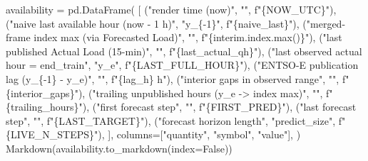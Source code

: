 \documentclass[
  english,
  letterpaper,
]{scrbook}
\newenvironment{Shaded}{\begin{snugshade}}{\end{snugshade}}
\newcommand{\BuiltInTok}[1]{\textcolor[rgb]{0.00,0.23,0.31}{#1}}
\newcommand{\NormalTok}[1]{\textcolor[rgb]{0.00,0.23,0.31}{#1}}
\newcommand{\OperatorTok}[1]{\textcolor[rgb]{0.37,0.37,0.37}{#1}}
\newcommand{\SpecialCharTok}[1]{\textcolor[rgb]{0.37,0.37,0.37}{#1}}
\newcommand{\SpecialStringTok}[1]{\textcolor[rgb]{0.13,0.47,0.30}{#1}}
\newcommand{\StringTok}[1]{\textcolor[rgb]{0.13,0.47,0.30}{#1}}
\newcommand{\VariableTok}[1]{\textcolor[rgb]{0.07,0.07,0.07}{#1}}
\begin{document}
\begin{Shaded}
\begin{Highlighting}[]
\NormalTok{availability }\OperatorTok{=}\NormalTok{ pd.DataFrame(}
\NormalTok{    [}
\NormalTok{        (}\StringTok{"render time (now)"}\NormalTok{,                          }\StringTok{""}\NormalTok{,       }\SpecialStringTok{f"}\SpecialCharTok{\{}\NormalTok{NOW\_UTC}\SpecialCharTok{\}}\SpecialStringTok{"}\NormalTok{),}
\NormalTok{        (}\StringTok{"naive last available hour (now {-} 1 h)"}\NormalTok{,      }\StringTok{"y\_\{{-}1\}"}\NormalTok{, }\SpecialStringTok{f"}\SpecialCharTok{\{}\NormalTok{naive\_last}\SpecialCharTok{\}}\SpecialStringTok{"}\NormalTok{),}
\NormalTok{        (}\StringTok{"merged{-}frame index max (via Forecasted Load)"}\NormalTok{, }\StringTok{""}\NormalTok{,     }\SpecialStringTok{f"}\SpecialCharTok{\{}\NormalTok{interim}\SpecialCharTok{.}\NormalTok{index}\SpecialCharTok{.}\BuiltInTok{max}\NormalTok{()}\SpecialCharTok{\}}\SpecialStringTok{"}\NormalTok{),}
\NormalTok{        (}\StringTok{"last published Actual Load (15{-}min)"}\NormalTok{,        }\StringTok{""}\NormalTok{,       }\SpecialStringTok{f"}\SpecialCharTok{\{}\NormalTok{last\_actual\_qh}\SpecialCharTok{\}}\SpecialStringTok{"}\NormalTok{),}
\NormalTok{        (}\StringTok{"last observed actual hour = end\_train"}\NormalTok{,      }\StringTok{"y\_e"}\NormalTok{,    }\SpecialStringTok{f"}\SpecialCharTok{\{}\NormalTok{LAST\_FULL\_HOUR}\SpecialCharTok{\}}\SpecialStringTok{"}\NormalTok{),}
\NormalTok{        (}\StringTok{"ENTSO{-}E publication lag (y\_\{{-}1\} {-} y\_e)"}\NormalTok{,     }\StringTok{""}\NormalTok{,       }\SpecialStringTok{f"}\SpecialCharTok{\{}\NormalTok{lag\_h}\SpecialCharTok{\}}\SpecialStringTok{ h"}\NormalTok{),}
\NormalTok{        (}\StringTok{"interior gaps in observed range"}\NormalTok{,            }\StringTok{""}\NormalTok{,       }\SpecialStringTok{f"}\SpecialCharTok{\{}\NormalTok{interior\_gaps}\SpecialCharTok{\}}\SpecialStringTok{"}\NormalTok{),}
\NormalTok{        (}\StringTok{"trailing unpublished hours (y\_e {-}\textgreater{} index max)"}\NormalTok{, }\StringTok{""}\NormalTok{,    }\SpecialStringTok{f"}\SpecialCharTok{\{}\NormalTok{trailing\_hours}\SpecialCharTok{\}}\SpecialStringTok{"}\NormalTok{),}
\NormalTok{        (}\StringTok{"first forecast step"}\NormalTok{,                        }\StringTok{""}\NormalTok{,       }\SpecialStringTok{f"}\SpecialCharTok{\{}\NormalTok{FIRST\_PRED}\SpecialCharTok{\}}\SpecialStringTok{"}\NormalTok{),}
\NormalTok{        (}\StringTok{"last forecast step"}\NormalTok{,                         }\StringTok{""}\NormalTok{,       }\SpecialStringTok{f"}\SpecialCharTok{\{}\NormalTok{LAST\_TARGET}\SpecialCharTok{\}}\SpecialStringTok{"}\NormalTok{),}
\NormalTok{        (}\StringTok{"forecast horizon length"}\NormalTok{,                    }\StringTok{"predict\_size"}\NormalTok{, }\SpecialStringTok{f"}\SpecialCharTok{\{}\NormalTok{LIVE\_N\_STEPS}\SpecialCharTok{\}}\SpecialStringTok{"}\NormalTok{),}
\NormalTok{    ],}
\NormalTok{    columns}\OperatorTok{=}\NormalTok{[}\StringTok{"quantity"}\NormalTok{, }\StringTok{"symbol"}\NormalTok{, }\StringTok{"value"}\NormalTok{],}
\NormalTok{)}
\NormalTok{Markdown(availability.to\_markdown(index}\OperatorTok{=}\VariableTok{False}\NormalTok{))}
\end{Highlighting}
\end{Shaded}
\end{document}
